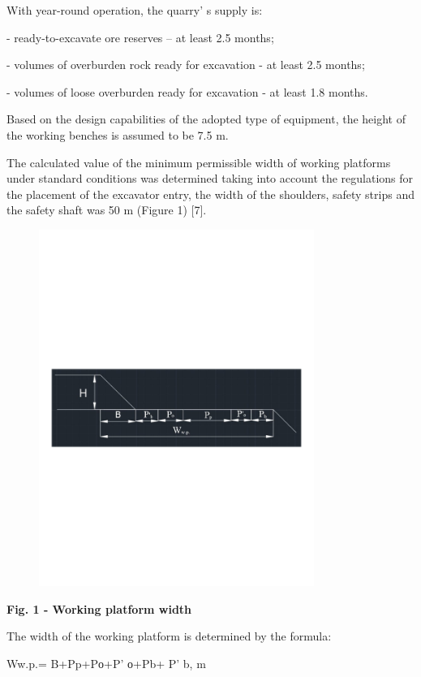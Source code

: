With year-round operation, the quarry' s supply is:

- ready-to-excavate ore reserves -- at least 2.5 months;

- volumes of overburden rock ready for excavation - at least 2.5 months;

- volumes of loose overburden ready for excavation - at least 1.8
months.

Based on the design capabilities of the adopted type of equipment, the
height of the working benches is assumed to be 7.5 m.

The calculated value of the minimum permissible width of working
platforms under standard conditions was determined taking into account
the regulations for the placement of the excavator entry, the width of
the shoulders, safety strips and the safety shaft was 50 m (Figure 1)
{[}7{]}.

\begin{figure}[H]
	\centering
	\includegraphics[width=0.8\textwidth]{media/gorn2/image18}
	\caption*{}
\end{figure}


{\bfseries Fig. 1 - Working platform width}

The width of the working platform is determined by the formula:

Ww.p.= B+Pp+Pо+P' о+Pb+ P' b, m

